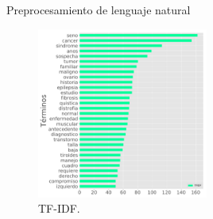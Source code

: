\documentclass[xcolor=dvipsnames]{beamer}
\begin{document}
\begin{frame}{Preprocesamiento de lenguaje natural}
	\begin{figure}[H]
		\centering
		\includegraphics[width=0.5\textwidth]{tfidf.pdf}
		\centering
		\caption{TF-IDF.} \label{fig:idf}
	\end{figure}
\end{frame}
\end{document}
